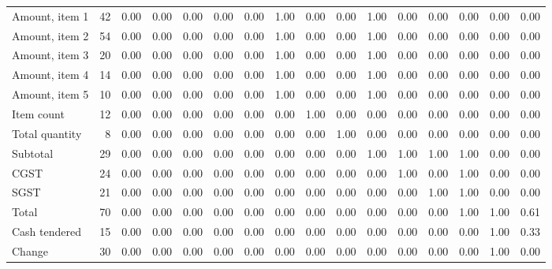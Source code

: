 \begin{tabular}{lrcccccccccccccc}
Amount, item 1 & 42 & 0.00 & 0.00 & 0.00 & 0.00 & 0.00 & 1.00 & 0.00 & 0.00 & 1.00 & 0.00 & 0.00 & 0.00 & 0.00 & 0.00\\
Amount, item 2 & 54 & 0.00 & 0.00 & 0.00 & 0.00 & 0.00 & 1.00 & 0.00 & 0.00 & 1.00 & 0.00 & 0.00 & 0.00 & 0.00 & 0.00\\
Amount, item 3 & 20 & 0.00 & 0.00 & 0.00 & 0.00 & 0.00 & 1.00 & 0.00 & 0.00 & 1.00 & 0.00 & 0.00 & 0.00 & 0.00 & 0.00\\
Amount, item 4 & 14 & 0.00 & 0.00 & 0.00 & 0.00 & 0.00 & 1.00 & 0.00 & 0.00 & 1.00 & 0.00 & 0.00 & 0.00 & 0.00 & 0.00\\
Amount, item 5 & 10 & 0.00 & 0.00 & 0.00 & 0.00 & 0.00 & 1.00 & 0.00 & 0.00 & 1.00 & 0.00 & 0.00 & 0.00 & 0.00 & 0.00\\
Item count & 12 & 0.00 & 0.00 & 0.00 & 0.00 & 0.00 & 0.00 & 1.00 & 0.00 & 0.00 & 0.00 & 0.00 & 0.00 & 0.00 & 0.00\\
Total quantity & 8 & 0.00 & 0.00 & 0.00 & 0.00 & 0.00 & 0.00 & 0.00 & 1.00 & 0.00 & 0.00 & 0.00 & 0.00 & 0.00 & 0.00\\
Subtotal & 29 & 0.00 & 0.00 & 0.00 & 0.00 & 0.00 & 0.00 & 0.00 & 0.00 & 1.00 & 1.00 & 1.00 & 1.00 & 0.00 & 0.00\\
CGST & 24 & 0.00 & 0.00 & 0.00 & 0.00 & 0.00 & 0.00 & 0.00 & 0.00 & 0.00 & 1.00 & 0.00 & 1.00 & 0.00 & 0.00\\
SGST & 21 & 0.00 & 0.00 & 0.00 & 0.00 & 0.00 & 0.00 & 0.00 & 0.00 & 0.00 & 0.00 & 1.00 & 1.00 & 0.00 & 0.00\\
Total & 70 & 0.00 & 0.00 & 0.00 & 0.00 & 0.00 & 0.00 & 0.00 & 0.00 & 0.00 & 0.00 & 0.00 & 1.00 & 1.00 & 0.61\\
Cash tendered & 15 & 0.00 & 0.00 & 0.00 & 0.00 & 0.00 & 0.00 & 0.00 & 0.00 & 0.00 & 0.00 & 0.00 & 0.00 & 1.00 & 0.33\\
Change & 30 & 0.00 & 0.00 & 0.00 & 0.00 & 0.00 & 0.00 & 0.00 & 0.00 & 0.00 & 0.00 & 0.00 & 0.00 & 1.00 & 0.00\\
\bottomrule
\end{tabular}
